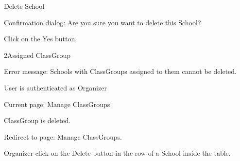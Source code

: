 
\begin{uc}{Delete School}


    \begin{uc-mss}
    \item Confirmation dialog: Are you sure you want to delete this School?
    \item Click on the Yes button.
    \end{uc-mss}

    \begin{uc-ext}

        \begin{uc-fail}{2}{Assigned ClassGroup}
        \item Error message: Schools with ClassGroups assigned to them cannot be deleted.
        \end{uc-fail}

    \end{uc-ext}

    \begin{uc-pre}
    \item User is authenticated as Organizer
    \item Current page: Manage ClassGroups
    \end{uc-pre}

    \begin{uc-post}
    \item ClassGroup is deleted.
    \item Redirect to page: Manage ClassGroups.
    \end{uc-post}

    \begin{uc-trig}
        Organizer click on the Delete button in the row of a School inside the table.
    \end{uc-trig}

\end{uc}

